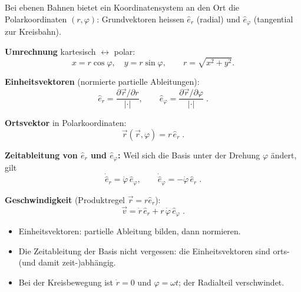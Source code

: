 

Bei ebenen Bahnen bietet ein Koordinatensystem an den Ort die
Polarkoordinaten $(r,\varphi)$: Grundvektoren heissen $\hat e_r$
(radial) und $\hat e_\varphi$ (tangential zur Kreisbahn).

\begin{werkzeugkasten}[Werkzeuge]
\textbf{Umrechnung} kartesisch $\leftrightarrow$ polar:
\begin{equation}
  x=r\cos\varphi,\quad y=r\sin\varphi,\qquad
  r=\sqrt{x^2+y^2}.
\end{equation}

\textbf{Einheitsvektoren} (normierte partielle Ableitungen):
\begin{equation}
  \hat e_r=\frac{\partial\vec r/\partial r}{|\cdot|},\qquad
  \hat e_\varphi=\frac{\partial\vec r/\partial\varphi}{|\cdot|}\;.
\end{equation}

\textbf{Ortsvektor} in Polarkoordinaten:
\begin{equation}
  \vec r(\vec r,\varphi)=r\,\hat e_r\;.
\end{equation}

\textbf{Zeitableitung von $\hat e_r$ und $\hat e_\varphi$:} Weil sich die
Basis unter der Drehung $\varphi$ ändert, gilt
\begin{equation}
  \dot{\hat e}_r=\dot\varphi\,\hat e_\varphi,\qquad
  \dot{\hat e}_\varphi=-\dot\varphi\,\hat e_r\;.
\end{equation}

\textbf{Geschwindigkeit} (Produktregel $\vec r=r\hat e_r$):
\begin{equation}
  \vec v=\dot r\,\hat e_r+r\,\dot\varphi\,\hat e_\varphi\;.
\end{equation}
\end{werkzeugkasten}

\begin{werkzeugkasten}[Vorgehen]
\begin{itemize}
  \item Einheitsvektoren: partielle Ableitung bilden, dann normieren.
  \item Die Zeitableitung der Basis nicht vergessen: die Einheitsvektoren
        sind orts- (und damit zeit-)abhängig.
  \item Bei der Kreisbewegung ist $\dot r=0$ und $\varphi=\omega t$; der
        Radialteil verschwindet.
\end{itemize}
\end{werkzeugkasten}

